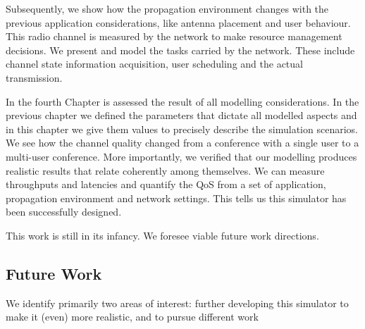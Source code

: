 Subsequently, we show how the propagation environment changes with the previous application considerations, like antenna placement and user behaviour. This radio channel is measured by the network to make resource management decisions. We present and model the tasks carried by the network. These include channel state information acquisition, user scheduling and the actual transmission.

In the fourth Chapter is assessed the result of all modelling considerations. In the previous chapter we defined the parameters that dictate all modelled aspects and in this chapter we give them values to precisely describe the simulation scenarios. We see how the channel quality changed from a conference with a single user to a multi-user conference. More importantly, we verified that our modelling produces realistic results that relate coherently among themselves. We can measure throughputs and latencies and quantify the QoS from a set of application, propagation environment and network settings. This tells us this simulator has been successfully designed.

This work is still in its infancy. We foresee viable future work directions.

\subsection*{Future Work}
\label{sec:future-work}

We identify primarily two areas of interest: further developing this simulator to make it (even) more realistic, and to pursue different work



